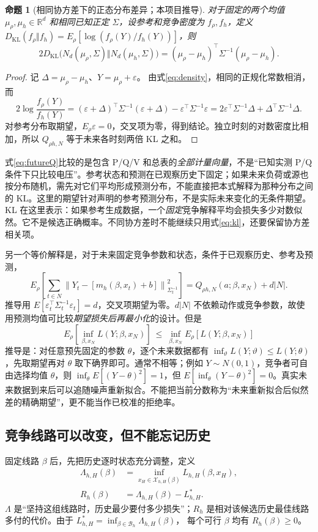 \documentclass[UTF8,fontset=fandol,11pt,a4paper]{ctexart}
\newtheorem{proposition}{命题}
\newcommand{\R}{\mathbb R}
\newcommand{\norm}[1]{\left\lVert#1\right\rVert}
\newcommand{\KL}{D_{\mathrm{KL}}}
\begin{document}
\begin{proposition}[相同协方差下的正态分布差异；本项目推导]
对于固定的两个均值 $\mu_\rho,\mu_h\in\R^d$ 和相同已知正定 $\Sigma$，设参考和竞争密度为 $f_\rho,f_h$，定义
$\KL(f_\rho\Vert f_h)=E_\rho[\log(f_\rho(Y)/f_h(Y))]$，则
\begin{equation}
 2\KL\bigl(N_d(\mu_\rho,\Sigma)\Vert N_d(\mu_h,\Sigma)\bigr)
   =(\mu_\rho-\mu_h)^\top\Sigma^{-1}(\mu_\rho-\mu_h).
 \label{eq:kl}
\end{equation}
\end{proposition}
\begin{proof}
记 $\Delta=\mu_\rho-\mu_h$、$Y=\mu_\rho+\varepsilon$。
由式\eqref{eq:density}，相同的正规化常数相消，而
\[
 2\log\frac{f_\rho(Y)}{f_h(Y)}
 =(\varepsilon+\Delta)^\top\Sigma^{-1}(\varepsilon+\Delta)
     -\varepsilon^\top\Sigma^{-1}\varepsilon
 =2\varepsilon^\top\Sigma^{-1}\Delta
     +\Delta^\top\Sigma^{-1}\Delta .
\]
对参考分布取期望，$E_\rho\varepsilon=0$，交叉项为零，得到结论。独立时刻的对数密度比相加，所以 $Q_{\rho h,N}$ 等于未来各时刻两倍 KL 之和。
\end{proof}
式\eqref{eq:futureQ}比较的是包含 P/Q/V 和总表的\emph{全部计量向量}，不是“已知实测 P/Q 条件下只比较电压”。参考状态和预测在已观察历史下固定；如果未来负荷或源也按分布随机，需先对它们平均形成预测分布，不能直接把本式解释为那种分布之间的 KL。这里的期望针对声明的参考预测分布，不是实际未来变化的无条件期望。
KL 在这里表示：如果参考生成数据，一个\emph{固定}竞争解释平均会损失多少对数似然。它不是候选正确概率。不同协方差时不能继续只用式\eqref{eq:kl}，还要保留协方差相关项。

另一个等价解释是，对于未来固定竞争参数和状态，条件于已观察历史、参考及预测，
\[
 E_\rho\!\left[\sum_{t\in N}
   \norm{Y_t-[m_h(\beta,x_t)+b]}_{\Sigma_t^{-1}}^2\right]
     =Q_{\rho h,N}(a;\beta,x_N)+d|N|.
\]
推导用 $E[\varepsilon_t^\top\Sigma_t^{-1}\varepsilon_t]=d$，交叉项期望为零。$d|N|$ 不依赖动作或竞争参数，故使用预测均值可比较\emph{期望损失后再最小化}的设计。但是
\[
 E_\rho[\inf_{\beta,x_N} L(Y;\beta,x_N)]
       \ \le\ \inf_{\beta,x_N}E_\rho[L(Y;\beta,x_N)]
\]
推导是：对任意预先固定的参数 $\theta$，逐个未来数据都有 $\inf_\vartheta L(Y;\vartheta)\le L(Y;\theta)$，先取期望再对 $\theta$ 取下确界即可。通常不相等；例如 $Y\sim N(0,1)$，竞争者可自由选择均值 $\theta$，则 $\inf_\theta E[(Y-\theta)^2]=1$，但 $E[\inf_\theta(Y-\theta)^2]=0$。真实未来数据到来后可以追随噪声重新拟合。不能把当前分数称为“未来重新拟合后似然差的精确期望”，更不能当作已校准的拒绝率。

\subsection{竞争线路可以改变，但不能忘记历史}
固定线路 $\beta$ 后，先把历史逐时状态充分调整，定义
\begin{align}
 \Lambda_{h,H}(\beta)&=
    \inf_{x_H\in\mathcal X_{h,H}(\beta)}L_{h,H}(\beta,x_H),
       \label{eq:profile}\\
 R_h(\beta)&=\Lambda_{h,H}(\beta)-L_{h,H}^* .
       \label{eq:penalty}
\end{align}
$\Lambda$ 是“坚持这组线路时，历史最少要付多少损失”；$R_h$ 是相对该候选历史最佳线路多付的代价。由于
$L_{h,H}^*=\inf_{\beta\in\mathcal B_h}\Lambda_{h,H}(\beta)$，
每个可行 $\beta$ 均有 $R_h(\beta)\ge0$。
\end{document}
